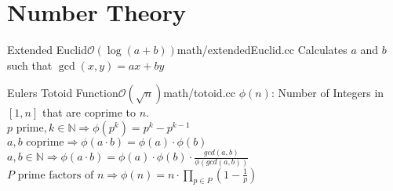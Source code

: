 \section{Number Theory}
\begin{code}{Extended Euclid}{$\mathcal{O}(\log(a + b))$}{math/extendedEuclid.cc} 
  Calculates $a$ and $b$ such that $\gcd(x, y) = ax + by$
\end{code}


\begin{code}{Eulers Totoid Function}{$\mathcal{O}(\sqrt{n})$}{math/totoid.cc}
$\phi(n)$: Number of Integers in $[1, n]$ that are coprime to $n$.\\
$p \text{ prime}, k \in \mathbb{N} \Rightarrow \phi(p^k) = p^k - p^{k-1}$ \\
$a, b \text{ coprime} \Rightarrow \phi(a \cdot b) = \phi(a) \cdot \phi(b)$ \\
$a, b \in \mathbb{N} \Rightarrow \phi(a \cdot b) = \phi(a) \cdot \phi(b) \cdot \frac{gcd(a, b)}{\phi(gcd(a,b))}$ \\
$P \text{ prime factors of } n \Rightarrow \phi(n) = n \cdot \prod_{p \in P} (1 - \frac{1}{p})$
\end{code}

